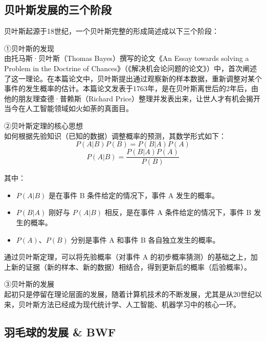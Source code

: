 \documentclass[12pt]{article}
\begin{document}
\subsection{贝叶斯发展的三个阶段}
贝叶斯起源于18世纪，一个贝叶斯完整的形成简述成以下三个阶段：

①贝叶斯的发现 \\
由托马斯·贝叶斯（Thomas Bayes）撰写的论文《An Essay towards solving a Problem in the Doctrine of Chances》（《解决机会论问题的论文》）中，首次阐述了这一理论。在本篇论文中，贝叶斯提出通过观察新的样本数据，重新调整对某个事件的发生概率的估计。本篇论文发表于1763年，是在贝叶斯离世后的2年后，由他的朋友理查德·普赖斯（Richard Price）整理并发表出来，让世人才有机会揭开当今在人工智能领域如火如荼的真面目。

②贝叶斯定理的核心思想 \\
如何根据先验知识（已知的数据）调整概率的预测，其数学形式如下：
\begin{equation}
	P(A|B){P(B)}={P(B|A)P(A)}
	\end{equation}
\begin{equation}
    P(A|B)=\frac{P(B|A)P(A)}{P(B)}
\end{equation}

其中：
\begin{itemize}
	\item $P(A|B)$ 是在事件 B 条件给定的情况下，事件 A 发生的概率。
	\item $P(B|A)$ 刚好与 $P(A|B)$ 相反，是在事件 A 条件给定的情况下，事件 B 发生的概率。
	\item $P(A)$、$P(B)$ 分别是事件 A 和事件 B 各自独立发生的概率。
	\end{itemize}

通过贝叶斯定理，可以将先验概率（对事件 A 的初步概率猜测）的基础之上，加上新的证据（新的样本、新的数据）相结合，得到更新后的概率（后验概率）。

③贝叶斯的发展 \\
起初只是停留在理论层面的发展，随着计算机技术的不断发展，尤其是从20世纪以来，贝叶斯方法已经成为现代统计学、人工智能、机器学习中的核心一环。


\subsection{羽毛球的发展 \& BWF}

\end{document}
